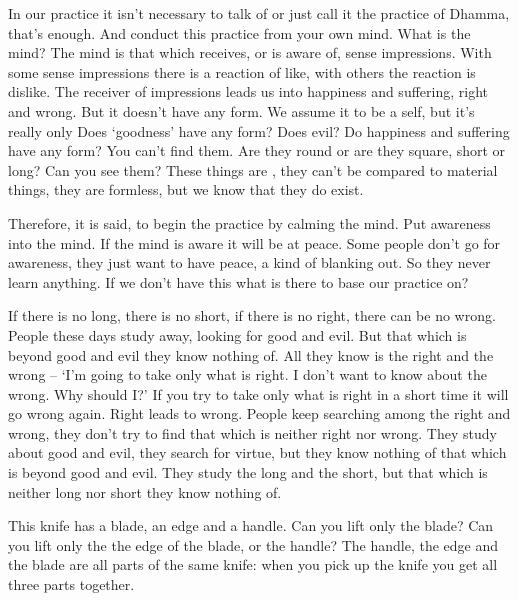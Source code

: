 In our practice it isn't necessary to talk of  or  just call it the practice of Dhamma, that's enough. And conduct this practice from your own mind. What is the mind? The mind is that which receives, or is aware of, sense impressions. With some sense impressions there is a reaction of like, with others the reaction is dislike. The receiver of impressions leads us into happiness and suffering, right and wrong. But it doesn't have any form. We assume it to be a self, but it's really only  Does `goodness' have any form? Does evil? Do happiness and suffering have any form? You can't find them. Are they round or are they square, short or long? Can you see them? These things are , they can't be compared to material things, they are formless, but we know that they do exist.

Therefore, it is said, to begin the practice by calming the mind. Put awareness into the mind. If the mind is aware it will be at peace. Some people don't go for awareness, they just want to have peace, a kind of blanking out. So they never learn anything. If we don't have this  what is there to base our practice on?

If there is no long, there is no short, if there is no right, there can be no wrong. People these days study away, looking for good and evil. But that which is beyond good and evil they know nothing of. All they know is the right and the wrong -- `I'm going to take only what is right. I don't want to know about the wrong. Why should I?' If you try to take only what is right in a short time it will go wrong again. Right leads to wrong. People keep searching among the right and wrong, they don't try to find that which is neither right nor wrong. They study about good and evil, they search for virtue, but they know nothing of that which is beyond good and evil. They study the long and the short, but that which is neither long nor short they know nothing of.

This knife has a blade, an edge and a handle. Can you lift only the blade? Can you lift only the the edge of the blade, or the handle? The handle, the edge and the blade are all parts of the same knife: when you pick up the knife you get all three parts together.

